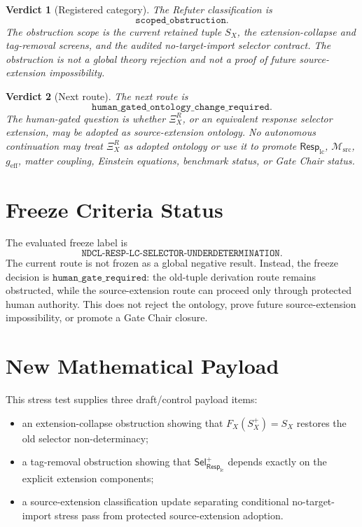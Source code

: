 \documentclass[11pt]{article}
\newcommand{\RespLC}{\mathsf{Resp}_{\mathrm{lc}}}
\newcommand{\SelResp}{\mathsf{Sel}_{\RespLC}}
\newcommand{\Msrc}{\mathcal{M}_{\mathrm{src}}}
\newcommand{\geff}{g_{\mathrm{eff}}}
\newcommand{\XiR}{\Xi_X^R}
\newcommand{\SX}{S_X}
\newcommand{\Splus}{S_X^+}
\newtheorem{verdict}{Verdict}
\begin{document}
\begin{verdict}[Registered category]
The Refuter classification is
\[
  \texttt{scoped\_obstruction}.
\]
The obstruction scope is the current retained tuple \(\SX\), the
extension-collapse and tag-removal screens, and the audited
no-target-import selector contract. The obstruction is not a global
theory rejection and not a proof of future source-extension
impossibility.
\end{verdict}

\begin{verdict}[Next route]
The next route is
\[
  \texttt{human\_gated\_ontology\_change\_required}.
\]
The human-gated question is whether \(\XiR\), or an equivalent response
selector extension, may be adopted as source-extension ontology. No
autonomous continuation may treat \(\XiR\) as adopted ontology or use it
to promote \(\RespLC\), \(\Msrc\), \(\geff\), matter coupling, Einstein
equations, benchmark status, or Gate Chair status.
\end{verdict}

\section{Freeze Criteria Status}

The evaluated freeze label is
\[
\texttt{NDCL-RESP-LC-SELECTOR-UNDERDETERMINATION}.
\]
The current route is not frozen as a global negative result. Instead,
the freeze decision is \(\texttt{human\_gate\_required}\): the old-tuple
derivation route remains obstructed, while the source-extension route
can proceed only through protected human authority. This does not reject
the ontology, prove future source-extension impossibility, or promote a
Gate Chair closure.

\section{New Mathematical Payload}

This stress test supplies three draft/control payload items:
\begin{itemize}
  \item an extension-collapse obstruction showing that
  \(F_X(\Splus)=\SX\) restores the old selector non-determinacy;
  \item a tag-removal obstruction showing that
  \(\SelResp^{+}\) depends exactly on the explicit extension components;
  \item a source-extension classification update separating conditional
  no-target-import stress pass from protected source-extension adoption.
\end{itemize}
\end{document}
